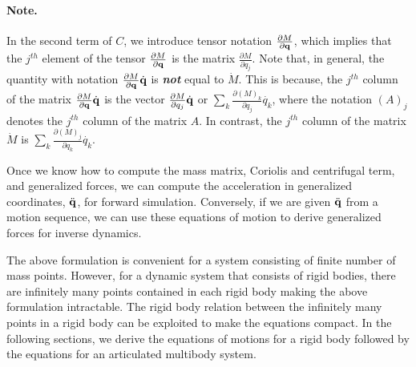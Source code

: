 \paragraph{Note.} In the second term of $C$, we introduce tensor notation $\frac{\partial M}{\partial \mathbf{q}}$, which implies that the $j^{th}$ element of the tensor $\frac{\partial M}{\partial \mathbf{q}}$ is the matrix $\frac{\partial M}{\partial {q}_j}$. Note that, in general, the quantity with notation $\frac{\partial M}{\partial \mathbf{q}} \dot{\mathbf{q}}$ is \textbf{\emph{not}} equal to $\dot{M}$. This is because, the $j^{th}$ column of the matrix $\frac{\partial M}{\partial \mathbf{q}} \dot{\mathbf{q}}$ is the vector $\frac{\partial M}{\partial q_j} \dot{\mathbf{q}}$ or $\sum_k \frac{\partial (M)_k}{\partial q_j} \dot{{q}_k}$, where the notation $(A)_j$ denotes the $j^{th}$ column of the matrix $A$. In contrast, the $j^{th}$ column of the matrix $\dot{M}$ is $\sum_k \frac{\partial (M)_j}{\partial q_k} \dot{{q}_k}$.

Once we know how to compute the mass matrix, Coriolis and centrifugal
term, and generalized forces, we can compute the acceleration in
generalized coordinates, $\ddot{\mathbf{q}}$, for forward
simulation. Conversely, if we are given $\ddot{\mathbf{q}}$ from a motion
sequence, we can use these equations of motion to derive generalized
forces for inverse dynamics. 

The above formulation is convenient for a system consisting of finite number of mass points. However, for a dynamic system that consists of rigid bodies, there are infinitely many points contained in each rigid body making the above formulation intractable. The rigid body relation between the infinitely many points in a rigid body can be exploited to make the equations compact. In the following sections, we derive the equations of motions for a rigid body followed by the equations for an articulated multibody system.

